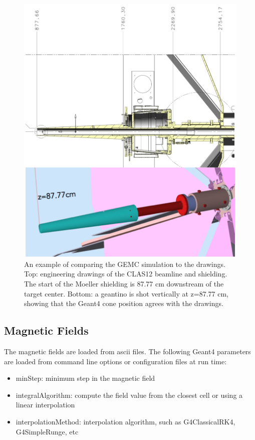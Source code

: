 \begin{figure}
	\centering
	\includegraphics[width=0.95\columnwidth,keepaspectratio]{img/cadValidationExample.png}
	\caption{An example of comparing the GEMC simulation to the drawings. Top: engineering drawings of
             the CLAS12 beamline and shielding. The start of the Moeller shielding is 87.77 cm downstream
             of the target center. Bottom: a geantino is shot vertically at z=87.77 cm, showing that the
             Geant4 cone position agrees with the drawings.}
	\label{fig:cadValidationExample}
\end{figure}



\subsection{Magnetic Fields}
The magnetic fields are loaded from ascii files. The following Geant4 parameters are loaded from
command line options or configuration files at run time:

\begin{itemize}
	\item minStep: minimum step in the magnetic field
	\item integralAlgorithm: compute the field value from the closest cell or using a linear interpolation
	\item interpolationMethod: interpolation algorithm, such as G4ClassicalRK4, G4SimpleRunge, etc
\end{itemize}

